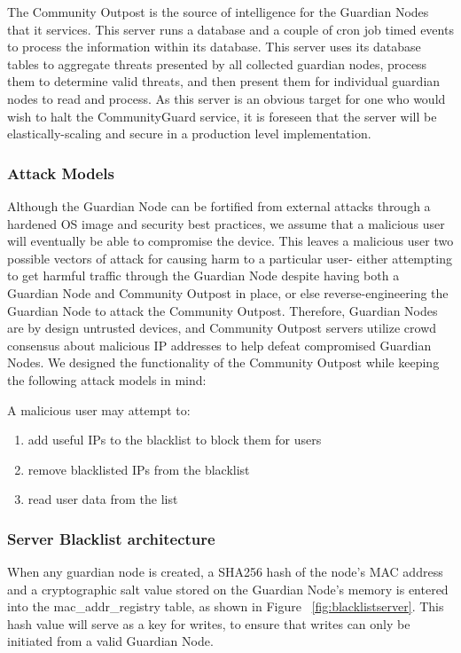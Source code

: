 The Community Outpost is the source of intelligence for the Guardian Nodes that it services. This server runs a database and a couple of cron job timed events to process the information within its database. This server uses its database tables to aggregate threats presented by all collected guardian nodes, process them to determine valid threats, and then present them for individual guardian nodes to read and process. As this server is an obvious target for one who would wish to halt the CommunityGuard service, it is foreseen that the server will be elastically-scaling and secure in a production level implementation. 

\subsubsection{Attack Models}
\label{sec:design:attacks}
Although the Guardian Node can be fortified from external attacks through a hardened OS image and security best practices, we assume that a malicious user will eventually be able to compromise the device. This leaves a malicious user two possible vectors of attack for causing harm to a particular user- either attempting to get harmful traffic through the Guardian Node despite having both a Guardian Node and Community Outpost in place, or else reverse-engineering the Guardian Node to attack the Community Outpost. Therefore, Guardian Nodes are by design untrusted devices, and Community Outpost servers utilize crowd consensus about malicious IP addresses to help defeat compromised Guardian Nodes.
We designed the functionality of the Community Outpost while keeping the following attack models in mind:

A malicious user may attempt to:
\begin{enumerate}
\item add useful IPs to the blacklist to block them for users
\item remove blacklisted IPs from the blacklist
\item read user data from the list
\end{enumerate}

\subsubsection{Server Blacklist architecture}
\label{sec:design:blacklist}
When any guardian node is created, a SHA256 hash of the node's MAC address and a cryptographic salt value stored on the Guardian Node's memory is entered into the mac_addr_registry table, as shown in Figure ~\ref{fig:blacklistserver}. This hash value will serve as a key for writes, to ensure that writes can only be initiated from a valid Guardian Node.

